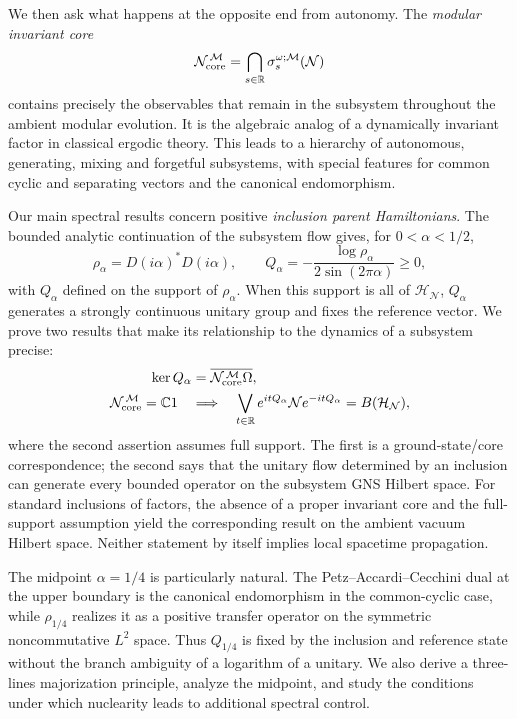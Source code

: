 \documentclass[a4paper,11pt]{article}
\theoremstyle{definition}
\newcommand{\mN}{\mathcal{N}}
\newcommand{\mH}{\mathcal{H}}
\newcommand{\mM}{\mathcal{M}}
\begin{document}
We then ask what happens at the opposite end from autonomy. The \emph{modular invariant core}
\begin{equation}
 \mN_{\rm core}^{\,\mM}
 =\bigcap_{s\in\mathbb R}\sigma_s^{\omega;\mM}(\mN)
 \label{eq:intro-core}
\end{equation}
contains precisely the observables that remain in the subsystem throughout the ambient modular evolution. It is the algebraic analog of a dynamically invariant factor in classical ergodic theory. This leads to a hierarchy of autonomous, generating, mixing and forgetful subsystems, with special features for common cyclic and separating vectors and the canonical endomorphism.

Our main spectral results concern positive \emph{inclusion parent Hamiltonians}. The bounded analytic continuation of the subsystem flow gives, for $0<\alpha<1/2$,
\begin{equation}
 \rho_\alpha=D(i\alpha)^*D(i\alpha),\qquad
 Q_\alpha=-\frac{\log\rho_\alpha}{2\sin(2\pi\alpha)}\geq0,
 \label{eq:intro-Halpha}
\end{equation}
with $Q_\alpha$ defined on the support of $\rho_\alpha$. When this support is all of $\mH_{\mN}$, $Q_\alpha$ generates a strongly continuous unitary group and fixes the reference vector. We prove two results that make its relationship to the dynamics of a subsystem precise:
\begin{align}
 \ker Q_\alpha
 &=\overline{\mN_{\rm core}^{\,\mM}\Omega},
 \label{eq:intro-ground-core}\\
 \mN_{\rm core}^{\,\mM}=\mathbb C1
 \quad&\Longrightarrow\quad
 \bigvee_{t\in\mathbb R}
 e^{itQ_\alpha}\mN e^{-itQ_\alpha}
 =B(\mH_{\mN}),
 \label{eq:intro-full-generation}
\end{align}
where the second assertion assumes full support. The first is a ground-state/core correspondence; the second says that the unitary flow determined by an inclusion can generate every bounded operator on the subsystem GNS Hilbert space. For standard inclusions of factors, the absence of a proper invariant core and the full-support assumption yield the corresponding result on the ambient vacuum Hilbert space. Neither statement by itself implies local spacetime propagation.

The midpoint $\alpha=1/4$ is particularly natural. The Petz--Accardi--Cecchini dual at the upper boundary is the canonical endomorphism in the common-cyclic case, while $\rho_{1/4}$ realizes it as a positive transfer operator on the symmetric noncommutative $L^2$ space. Thus $Q_{1/4}$ is fixed by the inclusion and reference state without the branch ambiguity of a logarithm of a unitary. We also derive a three-lines majorization principle, analyze the midpoint, and study the conditions under which nuclearity leads to additional spectral control.
\end{document}
